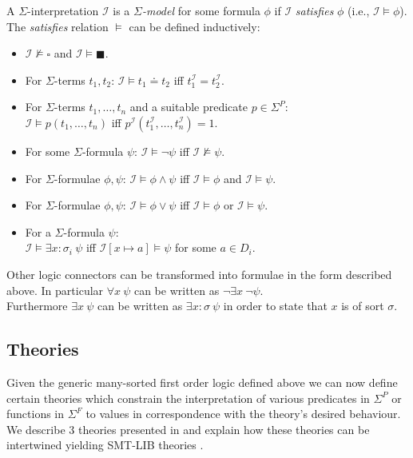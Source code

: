 \begin{definition}
A $\Sigma$-interpretation $\mathcal{I}$ is a \textit{$\Sigma$-model} for some formula $\phi$ if $\mathcal{I}$ \textit{satisfies} $\phi$ (i.e., $\mathcal{I}\vDash\phi$).\\
The \textit{satisfies} relation $\vDash$ can be defined inductively:
\begin{itemize}
    \item $\mathcal{I} \nvDash \square$ and $\mathcal{I} \vDash \blacksquare$.
    \item For $\Sigma$-terms $t_1, t_2$: 
    $\mathcal{I}\vDash t_1\doteq t_2$ iff $t_1^\mathcal{I}=t_2^\mathcal{I}$. 
    \item For $\Sigma$-terms $t_1,\dots,t_n$ and a suitable predicate $p\in\Sigma^P$:\\
    $\mathcal{I}\vDash p\left(t_1,\dots,t_n\right)$ iff $p^\mathcal{I}(t_1^\mathcal{I},\dots,t^\mathcal{I}_n)=1$. 
    \item For some $\Sigma$-formula $\psi$:
    $\mathcal{I}\vDash \neg\psi$ iff $\mathcal{I} \nvDash \psi$.
    \item For $\Sigma$-formulae $\phi, \psi$:
    $\mathcal{I}\vDash \phi\land\psi$ iff $\mathcal{I}\vDash\phi$ and $\mathcal{I}\vDash\psi$.
    \item For $\Sigma$-formulae $\phi, \psi$:
    $\mathcal{I}\vDash \phi\lor\psi$ iff $\mathcal{I}\vDash\phi$ or $\mathcal{I}\vDash\psi$. 
    \item For a $\Sigma$-formula $\psi$:\\
    $\mathcal{I}\vDash \exists x\colon\!\sigma_i\ \psi$ iff $\mathcal{I}\left[x\mapsto a\right] \vDash \psi$ for some $a\in D_i$.
\end{itemize}
\end{definition}

Other logic connectors can be transformed into formulae in the form described above. In particular $\forall x\ \psi$ can be written as $\neg\exists x\ \neg\psi$.\\
Furthermore $\exists x\ \psi$ can be written as $\exists x\colon\!\sigma\ \psi$ in order to state that $x$ is of sort $\sigma$.

\subsection{Theories}
Given the generic many-sorted first order logic defined above we can now define certain theories which constrain the interpretation of various predicates in $\Sigma^P$ or functions in $\Sigma^F$ to values in correspondence with the theory's desired behaviour. We describe 3 theories presented in \cite{Barrett-Tinelli-SMT} and explain how these theories can be intertwined yielding SMT-LIB theories \cite{BarFT-SMTLIB}.

